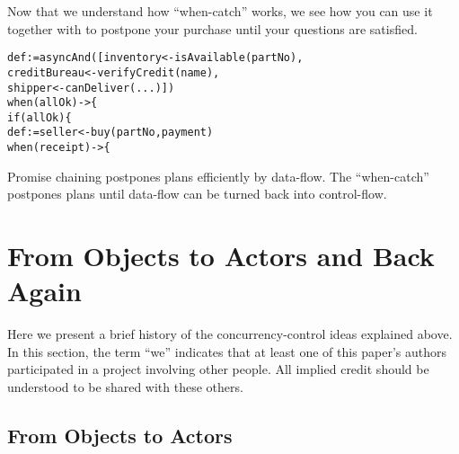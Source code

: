 \documentclass{llncs}
\begin{document}
Now that we understand how ``when-catch'' works, we see how you can
use it together with  to postpone your purchase until
your questions are satisfied.
%
\begin{alltt}
    def  := asyncAnd([inventory <- isAvailable(partNo),
                           creditBureau <- verifyCredit(name),
                           shipper <- canDeliver(...)])
    when (allOk) -> \{
        if (allOk) \{
            def  := seller <- buy(partNo, payment)
            when (receipt) -> \{
\end{alltt}
%
Promise chaining postpones plans efficiently by data-flow. The
``when-catch'' postpones plans until data-flow can be turned back into
control-flow.

\section{From Objects to Actors and Back Again}

Here we present a brief history of the concurrency-control ideas
explained above. In this section, the term ``we'' indicates that at
least one of this paper's authors participated in a project involving
other people. All implied credit should be understood to be shared
with these others.

\subsection{From Objects to Actors}
\end{document}
